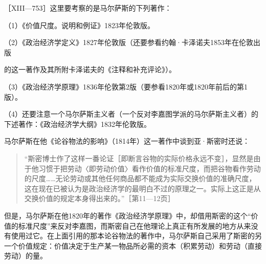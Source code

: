 

［XIII—753］这里要考察的是马尔萨斯的下列著作：

（1）《价值尺度。说明和例证》1823年伦敦版。

（2）《政治经济学定义》1827年伦敦版（还要参看约翰·卡泽诺夫1853年在伦敦出版

的这一著作及其所附卡泽诺夫的《注释和补充评论》）。

（3）《政治经济学原理》1836年伦敦第2版（要参看1820年或1820年前后的第1版）。

（4）还要注意一个马尔萨斯主义者（一个反对李嘉图学派的马尔萨斯主义者）的下述著作：《政治经济学大纲》1832年伦敦版。

马尔萨斯在他《论谷物法的影响》（1814年）这一著作中谈到亚·斯密时还说：

\begin{quote}{“斯密博士作了这样一番论证［即断言谷物的实际价格永远不变］，显然是由于他习惯于把劳动〈即劳动价值〉看作价值的标准尺度，而把谷物看作劳动的尺度……无论劳动或其他任何商品都不能成为实际交换价值的准确尺度，这在现在已被认为是政治经济学的最明白不过的原理之一。实际上这正是从交换价值的规定本身得出来的。”［第11—12页］}\end{quote}

但是，马尔萨斯在他1820年的著作《政治经济学原理》中，却借用斯密的这个“价值的标准尺度”来反对李嘉图，而斯密自己在他理论上真正有所发展的地方从来没有使用过它。在上面引用的那本论谷物法的著作中，马尔萨斯自己采用了斯密的另一个价值规定：价值决定于生产某一物品所必需的资本（积累劳动）和劳动（直接劳动）的量。

